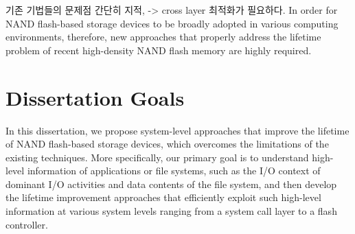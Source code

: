 기존 기법들의 문제점 간단히 지적,  -> 
cross layer 최적화가 필요하다. 
In order for NAND flash-based storage devices to be broadly adopted in
various computing environments, therefore,
new approaches that properly address the lifetime problem of recent
high-density NAND flash memory are highly required.

\begin{comment}
As the price-per-byte of NAND flash memory is rapidly decreasing,
NAND flash-based solid-state drives (SSDs) are emerging as a viable high-performance storage solution
for laptops, desktop PCs and high-performance enterprise systems.
However, as NAND flash memory technology scales down to 20-nm and below, storing data reliably in NAND flash memory
gets a key design challenge of NAND-based storage systems. 
For example, the number of program/erase (P/E) cycles allowed for each block is significantly reduced in recent triple-level cell (TLC)
NAND technology.
While older 5x-nm single-level cell (SLC) NAND flash memory can support about 10 K P/E cycles, recent 2x-nm TLC NAND flash memory
can barely support about 1 K P/E cycles~\cite{tlc}.
\end{comment}

\section{Dissertation Goals}
In this dissertation, we propose system-level approaches that improve 
the lifetime of NAND flash-based storage devices, which overcomes the limitations
of the existing techniques. More specifically, our primary goal is to understand 
high-level information of applications or file systems, such as the 
I/O context of dominant I/O activities and data contents of the file system,
and then develop the lifetime improvement approaches that efficiently exploit such
high-level information at various system levels ranging from a system call layer 
to a flash controller.

